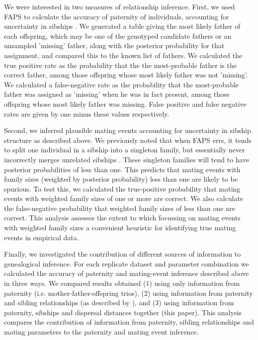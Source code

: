 \documentclass[10pt, a4paper, twocolumn]{article} %
\begin{document}
We were interested in two measures of relationship inference.
First, we used FAPS to calculate the accuracy of paternity of individuals, accounting for uncertainty in sibships \cite{ellis2018efficient}.
We generated a table giving the most likely father of each offspring, which may be one of the genotyped candidate fathers or an unsampled 'missing' father, along with the posterior probability for that assignment, and compared this to the known list of fathers.
We calculated the true positive rate as the probability that the the most-probable father is the correct father, among those offspring whose most likely father was not 'missing'.
We calculated a false-negative rate as the probability that the most-probable father was assigned as 'missing' when he was in fact present, among those offspring whose most likely father was missing.
False positive and false negative rates are given by one minus these values respectively.

Second, we inferred plausible mating events accounting for uncertainty in sibship structure as described above.
We previously noted that when FAPS errs, it tends to split one individual in a sibship into a singleton family, but essentially never incorrectly merges unrelated sibships \cite{ellis2018efficient}.
These singleton families will tend to have posterior probabilities of less than one.
This predicts that mating events with family sizes (weighted by posterior probability) less than one are likely to be spurious.
To test this, we calculated the true-positive probability that mating events with weighted family sizes of one or more are correct.
We also calculate the false-negative probability that weighted family sizes of less than one are correct.
This analysis assesses the extent to which focussing on mating events with weighted family sizes  a convenient heuristic for identifying true mating events in empirical data.

Finally, we investigated the contribution of different sources of information to genealogical inference.
For each replicate dataset and parameter combination we calculated the accuracy of paternity and mating-event inference described above in three ways.
We compared results obtained  (1) using only information from paternity (i.e. mother-father-offspring trios), (2) using information from paternity and sibling relationships (as described by \cite{ellis2018efficient}), and (3) using information from paternity, sibships and dispersal distances together (this paper).
This analysis compares the contribution of information from paternity, sibling relationships and mating parameters to the paternity and mating event inference.
\end{document}
